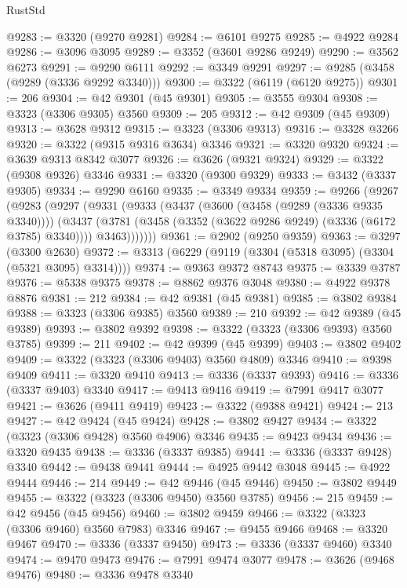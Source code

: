 \begin{lexlean}{RustStd}
\begin{coremodule}
@9283 := @3320 (@9270 @9281)
@9284 := @6101 @9275
@9285 := @4922 @9284
@9286 := @3096 @3095
@9289 := @3352 (@3601 @9286 @9249)
@9290 := @3562 @6273
@9291 := @9290 @6111
@9292 := @3349 @9291
@9297 := @9285 (@3458 (@9289 (@3336 @9292 @3340)))
@9300 := @3322 (@6119 (@6120 @9275))
@9301 := 206
@9304 := @42 @9301 (@45 @9301)
@9305 := @3555 @9304
@9308 := @3323 (@3306 @9305) @3560
@9309 := 205
@9312 := @42 @9309 (@45 @9309)
@9313 := @3628 @9312
@9315 := @3323 (@3306 @9313)
@9316 := @3328 @3266
@9320 := @3322 (@9315 @9316 @3634) @3346
@9321 := @3320 @9320
@9324 := @3639 @9313 @8342 @3077
@9326 := @3626 (@9321 @9324)
@9329 := @3322 (@9308 @9326) @3346
@9331 := @3320 (@9300 @9329)
@9333 := @3432 (@3337 @9305)
@9334 := @9290 @6160
@9335 := @3349 @9334
@9359 := @9266
    (@9267
      (@9283
        (@9297
          (@9331
            (@9333
              (@3437
                (@3600 (@3458 (@9289 (@3336 @9335 @3340))))
                (@3437
                  (@3781 (@3458 (@3352 (@3622 @9286 @9249) (@3336 (@6172 @3785) @3340))))
                  @3463)))))))
@9361 := @2902 (@9250 @9359)
@9363 := @3297 (@3300 @2630)
@9372 := @3313 (@6229 (@9119 (@3304 (@5318 @3095) (@3304 (@5321 @3095) @3314))))
@9374 := @9363 @9372 @8743
@9375 := @3339 @3787
@9376 := @5338 @9375
@9378 := @8862 @9376 @3048
@9380 := @4922 @9378 @8876
@9381 := 212
@9384 := @42 @9381 (@45 @9381)
@9385 := @3802 @9384
@9388 := @3323 (@3306 @9385) @3560
@9389 := 210
@9392 := @42 @9389 (@45 @9389)
@9393 := @3802 @9392
@9398 := @3322 (@3323 (@3306 @9393) @3560 @3785)
@9399 := 211
@9402 := @42 @9399 (@45 @9399)
@9403 := @3802 @9402
@9409 := @3322 (@3323 (@3306 @9403) @3560 @4809) @3346
@9410 := @9398 @9409
@9411 := @3320 @9410
@9413 := @3336 (@3337 @9393)
@9416 := @3336 (@3337 @9403) @3340
@9417 := @9413 @9416
@9419 := @7991 @9417 @3077
@9421 := @3626 (@9411 @9419)
@9423 := @3322 (@9388 @9421)
@9424 := 213
@9427 := @42 @9424 (@45 @9424)
@9428 := @3802 @9427
@9434 := @3322 (@3323 (@3306 @9428) @3560 @4906) @3346
@9435 := @9423 @9434
@9436 := @3320 @9435
@9438 := @3336 (@3337 @9385)
@9441 := @3336 (@3337 @9428) @3340
@9442 := @9438 @9441
@9444 := @4925 @9442 @3048
@9445 := @4922 @9444
@9446 := 214
@9449 := @42 @9446 (@45 @9446)
@9450 := @3802 @9449
@9455 := @3322 (@3323 (@3306 @9450) @3560 @3785)
@9456 := 215
@9459 := @42 @9456 (@45 @9456)
@9460 := @3802 @9459
@9466 := @3322 (@3323 (@3306 @9460) @3560 @7983) @3346
@9467 := @9455 @9466
@9468 := @3320 @9467
@9470 := @3336 (@3337 @9450)
@9473 := @3336 (@3337 @9460) @3340
@9474 := @9470 @9473
@9476 := @7991 @9474 @3077
@9478 := @3626 (@9468 @9476)
@9480 := @3336 @9478 @3340

\end{coremodule}
\end{lexlean}
